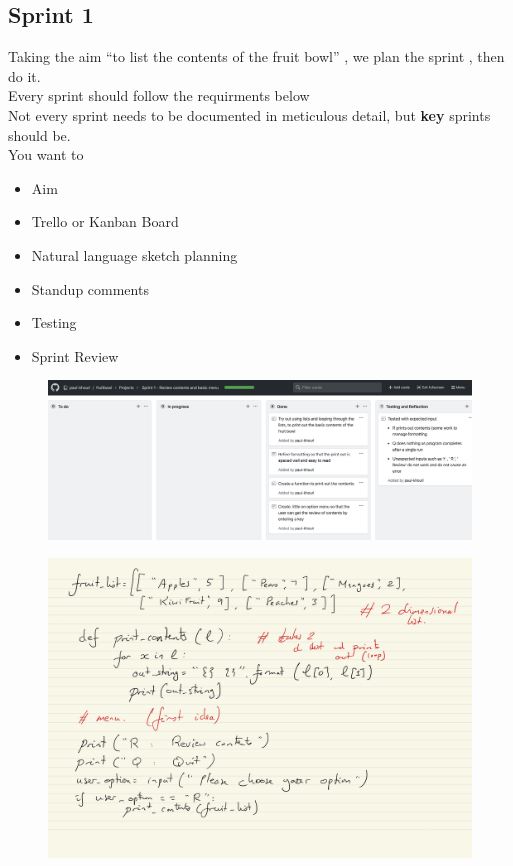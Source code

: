\documentclass[a4paper,12pt]{article}
\begin{document}
\subsection{Sprint 1}
Taking the aim ``to list the contents of the fruit bowl'' , we plan the sprint , then do it.\\
Every sprint should follow the requirments below\\
Not every sprint needs to be documented in meticulous detail, but \textbf{key} sprints should be.\\
You want to 
\begin{itemize}
	\item Aim
	\item Trello or Kanban Board
	\item  Natural language sketch planning
	\item Standup comments
	\item  Testing
	\item Sprint Review
\end{itemize}
\begin{figure}[!ht]
	\centering
	\includegraphics[width=16cm]{images/board_1.png}
\end{figure}
\begin{figure}[!ht]
	\centering
	\includegraphics[width=12cm]{images/Sprint_1_plan.jpg}
\end{figure}
\newpage

\end{document}
